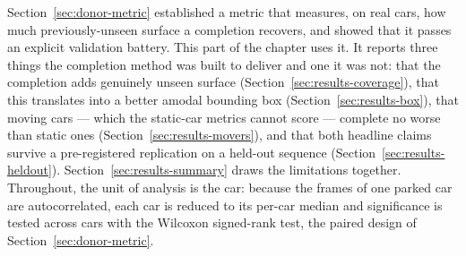 %
%
%
%
%
Section~\ref{sec:donor-metric} established a metric that measures, on real cars, how much
previously-unseen surface a completion recovers, and showed that it passes an
explicit validation battery. This part of the chapter uses it. It reports three
things the completion method was built to deliver and one it was not: that the
completion adds genuinely unseen surface (Section~\ref{sec:results-coverage}),
that this translates into a better amodal bounding box (Section~\ref{sec:results-box}),
that moving cars --- which the static-car metrics cannot score --- complete no
worse than static ones (Section~\ref{sec:results-movers}), and that both headline
claims survive a pre-registered replication on a held-out sequence
(Section~\ref{sec:results-heldout}). Section~\ref{sec:results-summary} draws the
limitations together. Throughout, the unit of analysis is the car: because the
frames of one parked car are autocorrelated, each car is reduced to its per-car
median and significance is tested across cars with the Wilcoxon signed-rank test,
the paired design of Section~\ref{sec:donor-metric}.


